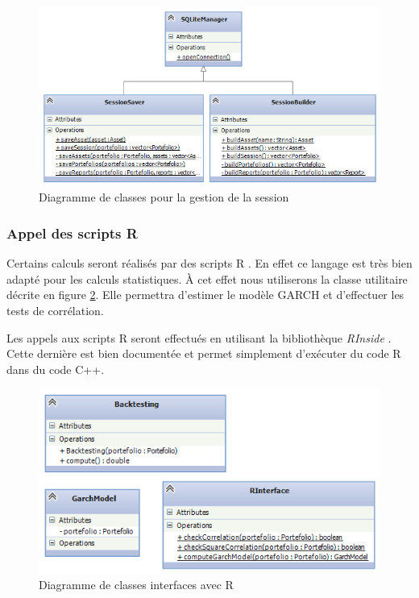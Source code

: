 \documentclass[a4paper,titlepage,french]{report}
\begin{document}
\begin{figure}
  	\center
  	\includegraphics[width=1\textwidth]{diagramme-classes-interface-bdd.png}
  	\caption{Diagramme de classes pour la gestion de la session}
  	\label{fig:diagramme-classes-interface-bdd}
\end{figure}


\subsubsection{Appel des scripts R}

Certains calculs seront réalisés par des scripts R \cite{website:R}.
En effet ce langage est très bien adapté pour les calculs statistiques.
\`A cet effet nous utiliserons la classe utilitaire décrite en figure \ref{fig:diagramme-classes-interface-r}.
Elle permettra d'estimer le modèle GARCH et d'effectuer les tests de corrélation.

Les appels aux scripts R seront effectués en utilisant la bibliothèque \textit{RInside} \cite{website:RInside}. Cette dernière est bien documentée et permet simplement d'exécuter du code R dans du code C++.

\begin{figure}
  	\center
  	\includegraphics[width=1\textwidth]{diagramme-classes-interface-r.png}
  	\caption{Diagramme de classes interfaces avec R}
  	\label{fig:diagramme-classes-interface-r}
\end{figure}
\end{document}
